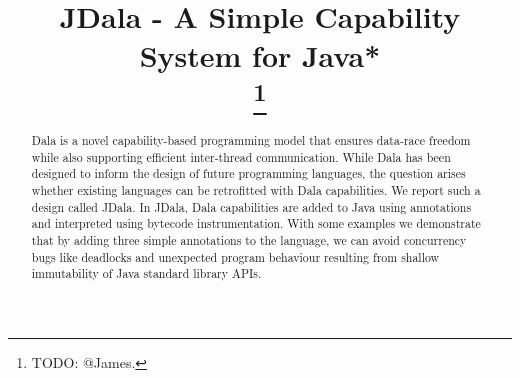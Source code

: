 \documentclass[conference]{IEEEtran}
\newcommand{\dala}{Dala\xspace}
\newcommand{\jdala}{JDala\xspace}
\begin{document}
	
	

\title{JDala - A Simple Capability System for Java*\\
\thanks{TODO: @James.}
}

\author{
\and
{}
\and
{}
\and
{}
\and
{}
}

\maketitle

\begin{abstract}


\dala is a novel capability-based programming model that ensures data-race freedom while also supporting efficient inter-thread communication. While \dala has been designed to inform the design of future programming languages, the question arises whether existing languages can be retrofitted with \dala capabilities. We report such a design called \jdala. In \jdala,  \dala capabilities are added to Java using annotations and interpreted using bytecode instrumentation. With some examples we demonstrate that by adding three simple annotations to the language, we can avoid concurrency bugs like deadlocks and unexpected program behaviour resulting from shallow immutability of Java standard library APIs. 

\end{abstract}
\end{document}
